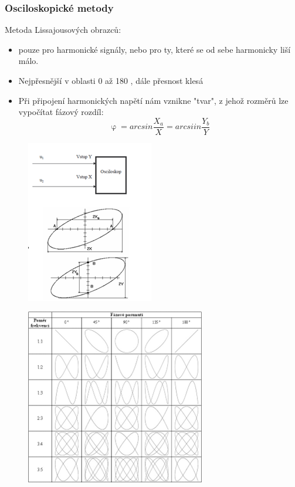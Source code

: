 \subsubsection*{Osciloskopické metody}
Metoda Lissajousových obrazců:
\begin{itemize}
    \item pouze pro harmonické signály, nebo pro ty, které se od sebe harmonicky liší málo.
    \item Nejpřesnější v oblasti 0  \textdegree až 180 \textdegree , dále přesnost klesá 
    \item Při připojení harmonických napětí nám vznikne "tvar", z jehož rozměrů lze vypočítat fázový rozdíl:
    \begin{equation}
        \upvarphi = arcsin\frac{X_a}{X} = arcsiin\frac{Y_b}{Y}
    \end{equation}
\end{itemize}
\begin{figure}[H]
    \includegraphics*[scale = 1]{images/Lissajous2.png}
\end{figure}

\begin{figure}[H]
    \includegraphics*[scale = 1]{images/Lissajous3.png}
\end{figure}

